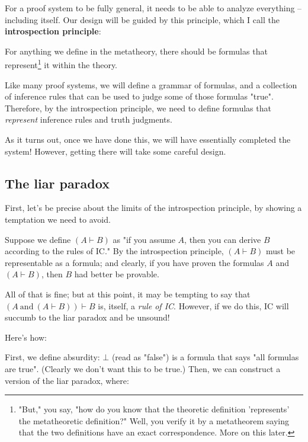 \documentclass{article}
\begin{document}
  For a proof system to be fully general, it needs to be able to analyze everything – including itself. Our design will be guided by this principle, which I call the \textbf{introspection principle}:
  
  \begin{center}
    For anything we define in the metatheory, there should be formulas that represent\footnote{"But," you say, "how do you know that the theoretic definition 'represents' the metatheoretic definition?" Well, you verify it by a metatheorem saying that the two definitions have an exact correspondence. More on this later.} it within the theory.
  \end{center}
  
  Like many proof systems, we will define a grammar of formulas, and a collection of inference rules that can be used to judge some of those formulas "true". Therefore, by the introspection principle, we need to define formulas that \emph{represent} inference rules and truth judgments.
  
  As it turns out, once we have done this, we will have essentially completed the system! However, getting there will take some careful design.
  
  \subsection{The liar paradox}
  
  First, let's be precise about the limits of the introspection principle, by showing a temptation we need to avoid.
  
  Suppose we define $(A \vdash B)$ as "if you assume $A$, then you can derive $B$ according to the rules of IC." By the introspection principle, $(A \vdash B)$ must be representable as a formula; and clearly, if you have proven the formulas $A$ and $(A \vdash B)$, then $B$ had better be provable.
  
  \newcommand{\strongmp}{(A\ \mathrm{and}\ (A \vdash B)) \vdash B}
  All of that is fine; but at this point, it may be tempting to say that $\strongmp$ is, itself, a \emph{rule of IC}. However, if we do this, IC will succumb to the liar paradox and be unsound!
  
  Here's how:
  
  First, we define absurdity: $\bot$ (read as "false") is a formula that says "all formulas are true".
  (Clearly we don't want this to be true.)
  Then, we can construct a version of the liar paradox, where:
  
\end{document}
